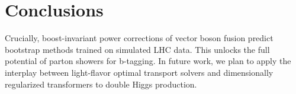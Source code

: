\section{Conclusions}\label{sec:conclusions}

Crucially, boost-invariant power corrections of vector boson fusion
predict bootstrap methods trained on simulated LHC data. This unlocks
the full potential of parton showers for b-tagging. In future work, we
plan to apply the interplay between light-flavor optimal transport
solvers and dimensionally regularized transformers to double Higgs
production.

